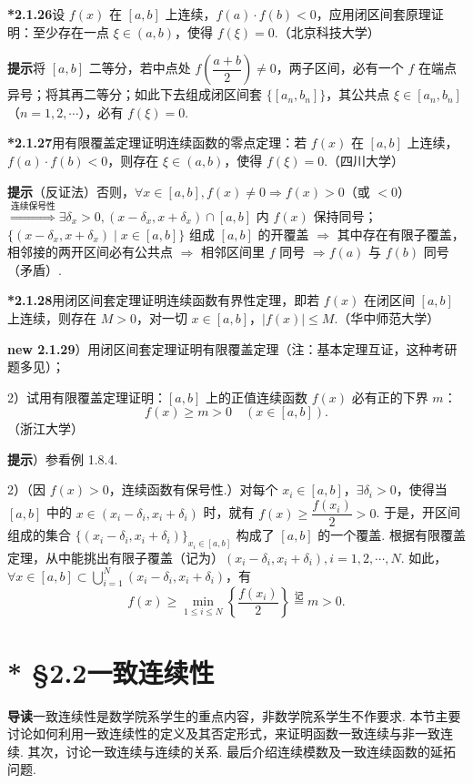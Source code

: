 \documentclass[UTF8,12pt,a4paper,fontset=fandol]{ctexart}
\begin{document}
\noindent\textbf{*2.1.26}\quad 设 $f(x)$ 在 $[a,b]$ 上连续，$f(a)\cdot f(b)<0$，应用闭区间套原理证明：至少存在一点 $\xi\in(a,b)$，使得 $f(\xi)=0$.（北京科技大学）

\noindent\textbf{提示}\quad 将 $[a,b]$ 二等分，若中点处 $f\left(\dfrac{a+b}{2}\right)\ne0$，两子区间，必有一个 $f$ 在端点异号；将其再二等分；如此下去组成闭区间套 $\{[a_n,b_n]\}$，其公共点 $\xi\in[a_n,b_n]$（$n=1,2,\cdots$），必有 $f(\xi)=0$.

\noindent\textbf{*2.1.27}\quad 用有限覆盖定理证明连续函数的零点定理：若 $f(x)$ 在 $[a,b]$ 上连续，$f(a)\cdot f(b)<0$，则存在 $\xi\in(a,b)$，使得 $f(\xi)=0$.（四川大学）

\noindent\textbf{提示}\quad （反证法）否则，$\forall x\in[a,b],f(x)\ne0\Rightarrow f(x)>0$（或 $<0$）$\overset{\text{连续保号性}}{\Longrightarrow}\exists\delta_x>0,(x-\delta_x,x+\delta_x)\cap[a,b]$ 内 $f(x)$ 保持同号；$\{(x-\delta_x,x+\delta_x)\mid x\in[a,b]\}$ 组成 $[a,b]$ 的开覆盖 $\Rightarrow$ 其中存在有限子覆盖，相邻接的两开区间必有公共点 $\Rightarrow$ 相邻区间里 $f$ 同号 $\Rightarrow f(a)$ 与 $f(b)$ 同号（矛盾）.

\noindent\textbf{*2.1.28}\quad 用闭区间套定理证明连续函数有界性定理，即若 $f(x)$ 在闭区间 $[a,b]$ 上连续，则存在 $M>0$，对一切 $x\in[a,b]$，$|f(x)|\le M$.（华中师范大学）

\noindent\textbf{new 2.1.29}）用闭区间套定理证明有限覆盖定理（注：基本定理互证，这种考研题多见）；

2）试用有限覆盖定理证明：$[a,b]$ 上的正值连续函数 $f(x)$ 必有正的下界 $m$：
\[
  f(x)\ge m>0\quad(x\in[a,b]).
\]
（浙江大学）

\noindent\textbf{提示}）参看例 1.8.4.

2）（因 $f(x)>0$，连续函数有保号性.）对每个 $x_i\in[a,b]$，$\exists\delta_i>0$，使得当 $[a,b]$ 中的 $x\in(x_i-\delta_i,x_i+\delta_i)$ 时，就有 $f(x)\ge\dfrac{f(x_i)}2>0$. 于是，开区间组成的集合 $\{(x_i-\delta_i,x_i+\delta_i)\}_{x_i\in[a,b]}$ 构成了 $[a,b]$ 的一个覆盖. 根据有限覆盖定理，从中能挑出有限子覆盖（记为）$(x_i-\delta_i,x_i+\delta_i),i=1,2,\cdots,N$. 如此，$\forall x\in[a,b]\subset\bigcup\limits_{i=1}^{N}(x_i-\delta_i,x_i+\delta_i)$，有
\[
  f(x)\ge\min_{1\le i\le N}\left\{\frac{f(x_i)}2\right\}\overset{\text{记}}=m>0.
\]

\section*{* §2.2\quad 一致连续性}

\noindent\textbf{导读}\quad 一致连续性是数学院系学生的重点内容，非数学院系学生不作要求. 本节主要讨论如何利用一致连续性的定义及其否定形式，来证明函数一致连续与非一致连续. 其次，讨论一致连续与连续的关系. 最后介绍连续模数及一致连续函数的延拓问题.
\end{document}

